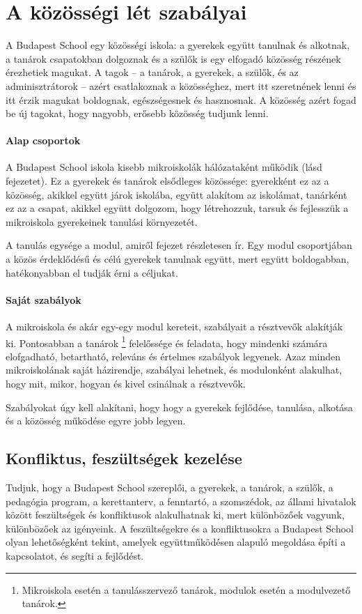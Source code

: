\section{A közösségi lét szabályai}
\label{sec:kozossegilet}
A Budapest School egy közösségi iskola: a gyerekek együtt tanulnak és alkotnak,
a tanárok
csapatokban dolgoznak és a szülők is egy elfogadó közösség részének érezhetiek
magukat. A tagok -- a tanárok, a gyerekek, a szülők,
és az adminisztrátorok -- azért csatlakoznak
a közösséghez, mert itt szeretnének lenni és itt érzik magukat boldognak,
egészségesnek és hasznosnak. A közösség azért fogad be új tagokat, hogy
nagyobb, erősebb közösség tudjunk lenni.

\paragraph{Alap csoportok} A Budapest School iskola kisebb mikroiskolák
hálózataként működik (lásd  fejezetet).
Ez a gyerekek és tanárok elsődleges közössége: gyerekként ez az a közösség,
akikkel együtt járok iskolába, együtt alakítom az iskolámat,
tanárként ez az a csapat, akikkel együtt dolgozom, hogy létrehozzuk, tarsuk és
fejlesszük a mikroiskola gyerekeinek tanulási környezetét.

A tanulás egysége a modul, amiről  fejezet részletesen ír.
Egy modul csoportjában a közös érdeklődésű és célú gyerekek tanulnak együtt,
mert együtt boldogabban, hatékonyabban el tudják érni a céljukat.

\paragraph{Saját szabályok}

A mikroiskola és akár egy-egy modul kereteit,
szabályait a résztvevők alakítják ki. Pontosabban a tanárok
\footnote{Mikroiskola esetén a tanulásszervező tanárok, modulok
    esetén a modulvezető tanárok.} felelőssége és
feladata, hogy mindenki számára elofgadható, betartható, releváns és értelmes
szabályok
legyenek. Azaz minden mikroiskolának saját házirendje, szabályai
lehetnek, és modulonként alakulhat, hogy mit, mikor, hogyan és kivel csinálnak
a résztvevők.

Szabályokat úgy kell alakítani, hogy
hogy a gyerekek fejlődése, tanulása, alkotása és a közösség működése egyre jobb
legyen.

\subsection{Konfliktus, feszültségek kezelése}
Tudjuk, hogy a Budapest School szereplői, a gyerekek, a tanárok, a szülők,
a pedagógia program, a kerettanterv, a fenntartó, a szomszédok, az állami
hivatalok  között feszültségek és konfliktusok alakulhatnak ki, mert
különbözőek vagyunk, különbözőek az igényeink. A feszültségekre és a
konfliktusokra a Budapest School olyan lehetőségként tekint, amelyek
együttműködésen alapuló megoldása építi a kapcsolatot, és segíti a fejlődést.

